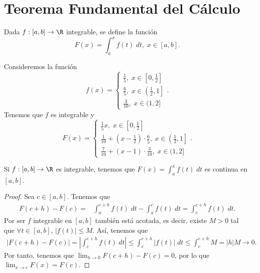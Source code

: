 \section{Teorema Fundamental del Cálculo}
\begin{fdefinition}[]
	\normalfont Dada $\displaystyle f :\left[a,b\right]  \to \R $ integrable, se define la función
	\[ F\left(x\right) = \int^{x}_{a} f\left(t\right) \; dt, \; x \in \left[a,b\right]  .\]
\end{fdefinition}
\begin{eg}
\normalfont Consideremos la función 
\[f\left(x\right) = 
\begin{cases}
	\frac{1}{5}, \; x \in \left[0,\frac{1}{2}\right] \\
	\frac{6}{5}, \; x \in \left(\frac{1}{2},1\right] \\
	\frac{3}{10}, \; x \in (1,2]
\end{cases}
.\]
Tenemos que $\displaystyle f $ es integrable y 
\[ F\left(x\right)= 
\begin{cases}
	\frac{1}{5}x, \; x \in \left[0,\frac{1}{2}\right] \\
	\frac{1}{10} + \left(x-\frac{1}{2}\right) \cdot \frac{6}{5}, \; x \in \left(\frac{1}{2},1\right] \\
	\frac{7}{10} + \left(x-1\right) \cdot \frac{3}{10}, \; x \in (1,2]
\end{cases}
.\]
\end{eg}
\begin{ftheorem}[]
	\normalfont Si $\displaystyle f : \left[a,b\right]  \to \R $ es integrable, tenemos que $\displaystyle F\left(x\right)= \int^{x}_{a} f\left(t\right) \; dt $ es continua en $\displaystyle \left[a,b\right]  $.
\end{ftheorem}
\begin{proof}
	Sea $\displaystyle c \in \left[a,b\right]  $. Tenemos que
	\[
	\begin{split}
		F\left(c + h\right)- F\left(c\right) = & \int^{c + h}_{a} f\left(t\right) \; dt - \int^{c}_{a} f\left(t\right) \; dt = \int^{c + h}_{c} f\left(t\right) \; dt .
	\end{split}
	\]
	Por ser $\displaystyle f $ integrable en $\displaystyle \left[a,b\right]  $ también está acotada, es decir, existe $\displaystyle M > 0 $ tal que $\displaystyle \forall t \in [a,b] $, $\displaystyle \left|f\left(t\right)\right| \leq M $. Así, tenemos que
	\[
	\begin{split}
	\left|F\left(c+h\right)-F\left(c\right)\right| = \left|\int^{c + h}_{c} f\left(t\right) \; dt\right| \leq \int^{c + h}_{c} \left|f\left(t\right)\right| \; dt \leq \int^{c + h}_{c} M = \left|h\right| M \to 0 .
	\end{split}
	\]
	Por tanto, tenemos que $\displaystyle \lim_{h \to 0}F\left(c+h\right)-F\left(c\right) = 0 $, por lo que $\displaystyle \lim_{x \to c}F\left(x\right)= F\left(c\right) $.
\end{proof}
